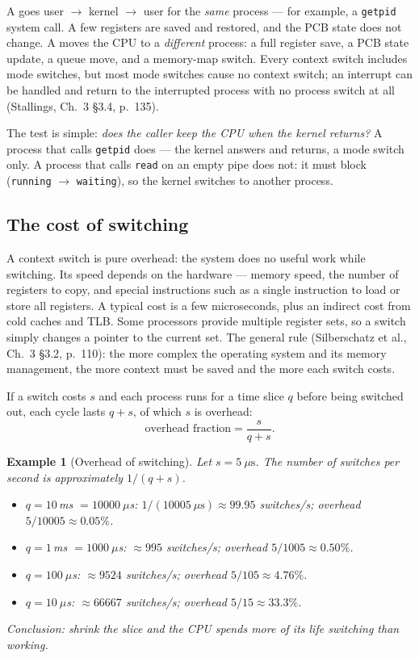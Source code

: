 \documentclass[11pt]{article}
\newtheorem{example}{Example}
\begin{document}
A  goes user $\to$ kernel $\to$ user for the \emph{same}
process --- for example, a \texttt{getpid} system call. A few registers are
saved and restored, and the PCB state does not change. A  moves the CPU to a \emph{different} process: a full register save, a
PCB state update, a queue move, and a memory-map switch. Every context switch
includes mode switches, but most mode switches cause no context switch; an
interrupt can be handled and return to the interrupted process with no process
switch at all (Stallings, Ch.~3 \S3.4, p.~135).

The test is simple: \emph{does the caller keep the CPU when the kernel returns?}
A process that calls \texttt{getpid} does --- the kernel answers and returns,
a mode switch only. A process that calls \texttt{read} on an empty pipe does
not: it must block (\texttt{running} $\to$ \texttt{waiting}), so the kernel
switches to another process.

\subsection{The cost of switching}

A context switch is pure overhead: the system does no useful work while
switching. Its speed depends on the hardware --- memory speed, the number of
registers to copy, and special instructions such as a single instruction to
load or store all registers. A typical cost is a few microseconds, plus an
indirect cost from cold caches and TLB. Some processors provide multiple
register sets, so a switch simply changes a pointer to the current set. The
general rule (Silberschatz et al., Ch.~3 \S3.2, p.~110): the more complex the
operating system and its memory management, the more context must be saved and
the more each switch costs.

If a switch costs $s$ and each process runs for a time slice $q$ before being
switched out, each cycle lasts $q + s$, of which $s$ is overhead:
\[
  \text{overhead fraction} = \frac{s}{q + s}.
\]

\begin{example}[Overhead of switching]
\label{ex:overhead}
Let $s = 5\ \mu\text{s}$. The number of switches per second is approximately
$1/(q+s)$.
\begin{itemize}
  \item $q = 10$\,ms $= 10000\ \mu$s: $1/(10005\ \mu\text{s}) \approx 99.95$
        switches/s; overhead $5/10005 \approx 0.05\%$.
  \item $q = 1$\,ms $= 1000\ \mu$s: $\approx 995$ switches/s; overhead
        $5/1005 \approx 0.50\%$.
  \item $q = 100\ \mu$s: $\approx 9524$ switches/s; overhead
        $5/105 \approx 4.76\%$.
  \item $q = 10\ \mu$s: $\approx 66667$ switches/s; overhead
        $5/15 \approx 33.3\%$.
\end{itemize}
\emph{Conclusion:} shrink the slice and the CPU spends more of its life
switching than working.
\end{example}
\end{document}
